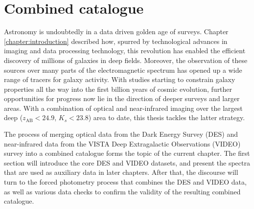 \renewcommand{\overbar}[1]{\mkern 1.5mu\overline{\mkern-1.5mu#1\mkern-1.5mu}\mkern 1.5mu}


\makeatletter
\let\ftype@table\ftype@figure
\makeatother

\DeclareUrlCommand\ULurl{%
  \renewcommand\UrlFont{\ttfamily\color{blue}}%
  \renewcommand\UrlLeft{\uline\bgroup}%
  \renewcommand\UrlRight{\egroup}}


\chapter{Combined \DESVIDEO catalogue}\label{chapter:catalogue}

\ifpdf
    \graphicspath{{Chapter2/Figs/Raster/}{Chapter2/Figs/PDF/}{Chapter2/Figs/}}
\else
    \graphicspath{{Chapter2/Figs/Vector/}{Chapter2/Figs/}}
\fi

Astronomy is undoubtedly in a data driven golden age of surveys. Chapter \ref{chapter:introduction} described how, spurred by technological advances in imaging and data processing technology, this revolution has enabled the efficient discovery of millions of galaxies in deep fields. Moreover, the observation of these sources over many parts of the electromagnetic spectrum has opened up a wide range of tracers for galaxy activity. With studies starting to constrain galaxy properties all the way into the first billion years of cosmic evolution, further opportunities for progress now lie in the direction of deeper surveys and larger areas. With a combination of optical and near-infrared imaging over the largest deep ($z_{\mathrm{AB}}<24.9$, $K_{s}<23.8$) area to date, this thesis tackles the latter strategy.  \par

The process of merging optical data from the Dark Energy Survey (DES) and near-infrared data from the VISTA Deep Extragalactic Observations (VIDEO) survey into a combined \DESVIDEO catalogue forms the topic of the current chapter. The first section will introduce the core DES and VIDEO datasets, and present the spectra that are used as auxiliary data in later chapters. After that, the discourse will turn to the forced photometry process that combines the DES and VIDEO data, as well as various data checks to confirm the validity of the resulting combined catalogue. \par



